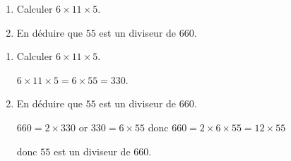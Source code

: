 \begin{exercice*}
    \begin{enumerate}
        \item Calculer $6\times 11\times 5$.
        \item En déduire que $55$ est un diviseur de $660$.
    \end{enumerate}
\end{exercice*}
\begin{corrige}
    \begin{enumerate}
        \item Calculer $6\times 11\times 5$.
        
        $6\times 11\times 5 = 6\times 55 = 330$.
        \item En déduire que $55$ est un diviseur de $660$.
        
        $660 = 2\times 330$ or $330 = 6\times 55$ donc $660 = 2\times 6\times 55= 12\times 55$

        donc $55$ est un diviseur de $660$.
    \end{enumerate}
\end{corrige}

